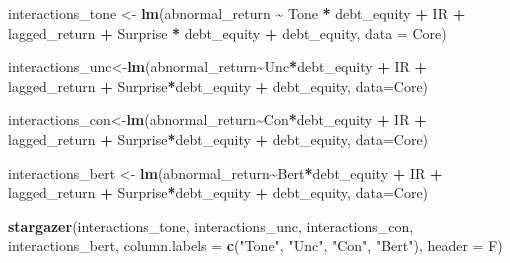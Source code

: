 \documentclass[
]{article}
\newenvironment{Shaded}{\begin{snugshade}}{\end{snugshade}}
\newcommand{\AttributeTok}[1]{\textcolor[rgb]{0.13,0.29,0.53}{#1}}
\newcommand{\FunctionTok}[1]{\textcolor[rgb]{0.13,0.29,0.53}{\textbf{#1}}}
\newcommand{\NormalTok}[1]{#1}
\newcommand{\OtherTok}[1]{\textcolor[rgb]{0.56,0.35,0.01}{#1}}
\newcommand{\SpecialCharTok}[1]{\textcolor[rgb]{0.81,0.36,0.00}{\textbf{#1}}}
\newcommand{\StringTok}[1]{\textcolor[rgb]{0.31,0.60,0.02}{#1}}
\begin{document}
\begin{Shaded}
\begin{Highlighting}[]
\NormalTok{interactions\_tone }\OtherTok{\textless{}{-}} \FunctionTok{lm}\NormalTok{(abnormal\_return }\SpecialCharTok{\textasciitilde{}}\NormalTok{ Tone }\SpecialCharTok{*}\NormalTok{ debt\_equity }\SpecialCharTok{+}\NormalTok{ IR }\SpecialCharTok{+}\NormalTok{ lagged\_return }\SpecialCharTok{+}\NormalTok{ Surprise }\SpecialCharTok{*}\NormalTok{ debt\_equity }\SpecialCharTok{+}\NormalTok{ debt\_equity, }\AttributeTok{data =}\NormalTok{ Core)}

\NormalTok{interactions\_unc}\OtherTok{\textless{}{-}}\FunctionTok{lm}\NormalTok{(abnormal\_return}\SpecialCharTok{\textasciitilde{}}\NormalTok{Unc}\SpecialCharTok{*}\NormalTok{debt\_equity }\SpecialCharTok{+}\NormalTok{ IR }\SpecialCharTok{+}\NormalTok{ lagged\_return }\SpecialCharTok{+}\NormalTok{ Surprise}\SpecialCharTok{*}\NormalTok{debt\_equity }\SpecialCharTok{+}\NormalTok{ debt\_equity, }\AttributeTok{data=}\NormalTok{Core)}

\NormalTok{interactions\_con}\OtherTok{\textless{}{-}}\FunctionTok{lm}\NormalTok{(abnormal\_return}\SpecialCharTok{\textasciitilde{}}\NormalTok{Con}\SpecialCharTok{*}\NormalTok{debt\_equity }\SpecialCharTok{+}\NormalTok{ IR }\SpecialCharTok{+}\NormalTok{ lagged\_return }\SpecialCharTok{+}\NormalTok{ Surprise}\SpecialCharTok{*}\NormalTok{debt\_equity }\SpecialCharTok{+}\NormalTok{ debt\_equity, }\AttributeTok{data=}\NormalTok{Core)}

\NormalTok{interactions\_bert }\OtherTok{\textless{}{-}} \FunctionTok{lm}\NormalTok{(abnormal\_return}\SpecialCharTok{\textasciitilde{}}\NormalTok{Bert}\SpecialCharTok{*}\NormalTok{debt\_equity }\SpecialCharTok{+}\NormalTok{ IR }\SpecialCharTok{+}\NormalTok{ lagged\_return }\SpecialCharTok{+}\NormalTok{ Surprise}\SpecialCharTok{*}\NormalTok{debt\_equity }\SpecialCharTok{+}\NormalTok{ debt\_equity, }\AttributeTok{data=}\NormalTok{Core)}

\FunctionTok{stargazer}\NormalTok{(interactions\_tone, interactions\_unc, interactions\_con, interactions\_bert, }\AttributeTok{column.labels =} \FunctionTok{c}\NormalTok{(}\StringTok{"Tone"}\NormalTok{, }\StringTok{"Unc"}\NormalTok{, }\StringTok{"Con"}\NormalTok{, }\StringTok{"Bert"}\NormalTok{), }\AttributeTok{header =}\NormalTok{ F)}
\end{Highlighting}
\end{Shaded}
\end{document}

